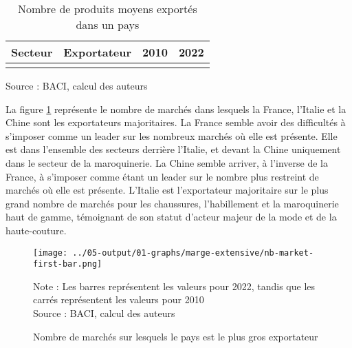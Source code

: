 \documentclass[french,10pt,a4paper]{article}
\begin{document}
\begin{table}[ht]
  \centering
  \begin{tabular}{lrrr}
    \hline
   Secteur & Exportateur & 2010 & 2022 \\
    \hline
    \\
    \hline
  \end{tabular}
  \captionsetup{justification=raggedright,singlelinecheck=false, font=small}
  \caption*{Source : BACI, calcul des auteurs}
  \captionsetup{justification=centering, singlelinecheck=true, font=normalsize}
  \caption{Nombre de produits moyens exportés dans un pays}
  \label{tab:table-nb-mean-product-export}
\end{table}

La figure \ref{fig:nb-market-first-bar} représente le nombre de marchés dans lesquels la France, l'Italie et la Chine sont les exportateurs majoritaires. La France semble avoir des difficultés à s'imposer comme un leader sur les nombreux marchés où elle est présente. Elle est dans l'ensemble des secteurs derrière l'Italie, et devant la Chine uniquement dans le secteur de la maroquinerie. La Chine semble arriver, à l'inverse de la France, à s'imposer comme étant un leader sur le nombre plus restreint de marchés où elle est présente. L'Italie est l'exportateur majoritaire sur le plus grand nombre de marchés pour les chaussures, l'habillement et la maroquinerie haut de gamme, témoignant de son statut d'acteur majeur de la mode et de la haute-couture.


\begin{figure}[!h]
  \centering  \texttt{[image: ../05-output/01-graphs/marge-extensive/nb-market-first-bar.png]}
  \captionsetup{justification=justified, singlelinecheck=false, font=small}
  \caption*{Note : Les barres représentent les valeurs pour 2022, tandis que les carrés représentent les valeurs pour 2010 \\
  Source : BACI, calcul des auteurs}
  \captionsetup{justification=centering, singlelinecheck=true, font=normalsize}
  \caption{Nombre de marchés sur lesquels le pays est le plus gros exportateur}
  \label{fig:nb-market-first-bar}
\end{figure}
\end{document}
